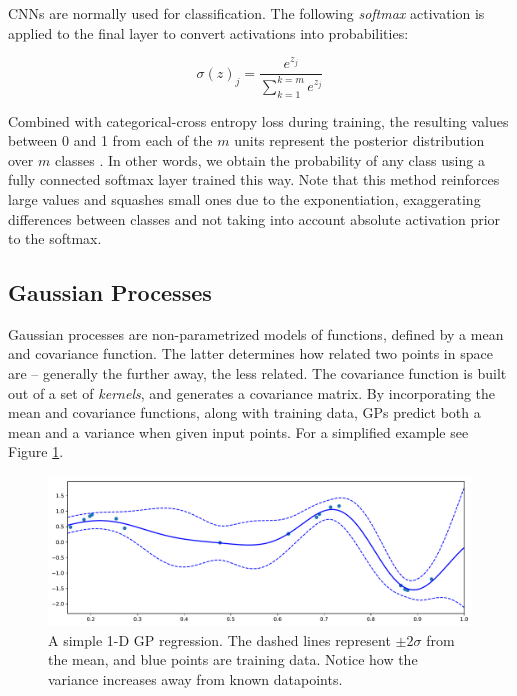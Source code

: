 \documentclass{article}
\begin{document}
CNNs are normally used for classification. The following \textit{softmax} activation is applied to the final layer to convert activations into probabilities:

\[ \sigma(z)_j = \frac{e^{z_j}}{\sum_{k=1}^{k=m}e^{z_j}} \]

Combined with categorical-cross entropy loss during training, the resulting values between 0 and 1 from each of the $m$ units represent the posterior distribution over $m$ classes \cite{bridle1990probabilistic}. In other words, we obtain the probability of any class using a fully connected softmax layer trained this way. Note that this method reinforces large values and squashes small ones due to the exponentiation, exaggerating differences between classes and not taking into account absolute activation prior to the softmax. 

\subsection{Gaussian Processes}
\label{sec:background:gp}



Gaussian processes are non-parametrized models of functions, defined by a mean and covariance function. The latter determines how related two points in space are -- generally the further away, the less related. The covariance function is built out of a set of \textit{kernels}, and generates a covariance matrix. By incorporating the mean and covariance functions, along with training data, GPs predict both a mean and a variance when given input points. For a simplified example see Figure \ref{fig:gp:basic}.

\begin{figure}[htb]
\centering
\includegraphics[width=\hsize]{figures/gp_basic.pdf}
\caption{A simple 1-D GP regression. The dashed lines represent $\pm2\sigma$ from the mean, and blue points are training data. Notice how the variance increases away from known datapoints.}
\label{fig:gp:basic}
\end{figure}
\end{document}
